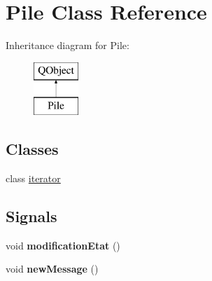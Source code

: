 \hypertarget{class_pile}{}\section{Pile Class Reference}
\label{class_pile}
Inheritance diagram for Pile\+:\begin{figure}[H]
\begin{center}
\leavevmode
\includegraphics[height=2.000000cm]{class_pile}
\end{center}
\end{figure}
\subsection*{Classes}
\begin{DoxyCompactItemize}
\item 
class \hyperlink{class_pile_1_1iterator}{iterator}
\end{DoxyCompactItemize}
\subsection*{Signals}
\begin{DoxyCompactItemize}
\item 
void {\bfseries modification\+Etat} ()\hypertarget{class_pile_ac55a0afb626baffd1019567cbaa7f4b2}{}\label{class_pile_ac55a0afb626baffd1019567cbaa7f4b2}

\item 
void {\bfseries new\+Message} ()\hypertarget{class_pile_a9ee28bbf0994bc8f75873b567ba98834}{}\label{class_pile_a9ee28bbf0994bc8f75873b567ba98834}

\end{DoxyCompactItemize}
